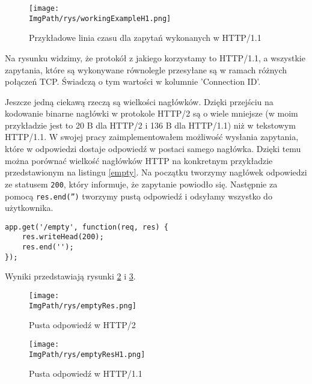 \documentclass[a4paper,12pt,twoside,openany]{report}
\newcommand{\ImgPath}{.}
\begin{document}
\begin{figure}[!htbp]
	\begin{center}
\centering
\texttt{[image: \\ImgPath/rys/workingExampleH1.png]}
\end{center}
	\caption{Przykładowe linia czasu dla zapytań wykonanych w HTTP/1.1}
	\label{schematWorkingExampleH1}
\end{figure}

Na rysunku widzimy, że protokół z jakiego korzystamy to HTTP/1.1, a wszystkie zapytania, które są wykonywane równolegle przesyłane są w ramach różnych połączeń TCP.
Świadczą o tym wartości w kolumnie 'Connection ID'.

Jeszcze jedną ciekawą rzeczą są wielkości nagłówków.
Dzięki przejściu na kodowanie binarne nagłówki w protokole HTTP/2 są o wiele mniejsze (w moim przykładzie jest to 20 B dla HTTP/2 i 136 B dla HTTP/1.1) niż w tekstowym HTTP/1.1.
W swojej pracy zaimplementowałem możliwość wysłania zapytania, które w odpowiedzi dostaje odpowiedź w postaci samego nagłówka.
Dzięki temu można porównać wielkość nagłówków HTTP na konkretnym przykładzie przedstawionym na listingu \ref{empty}.
Na początku tworzymy nagłówek odpowiedzi ze statusem \texttt{200}, który informuje, że zapytanie powiodło się.
Następnie za pomocą \texttt{res.end('')} tworzymy pustą odpowiedź i odsyłamy wszystko do użytkownika.

\begin{lstlisting}[caption=Wygląd funkcji wykonywanej po wykonaniu zapytania \texttt{GET} na adres \texttt{/empty}, label=empty]
app.get('/empty', function(req, res) {
	res.writeHead(200);
	res.end('');
});
\end{lstlisting}
Wyniki przedstawiają rysunki \ref{schematEmptyRes} i \ref{schematEmptyResH1}.

\begin{figure}[!htbp]
	\begin{center}
\centering
\texttt{[image: \\ImgPath/rys/emptyRes.png]}
\end{center}
	\caption{Pusta odpowiedź w HTTP/2}
	\label{schematEmptyRes}
\end{figure}

\begin{figure}[!htbp]
	\begin{center}
\centering
\texttt{[image: \\ImgPath/rys/emptyResH1.png]}
\end{center}
	\caption{Pusta odpowiedź w HTTP/1.1}
	\label{schematEmptyResH1}
\end{figure}
\end{document}
